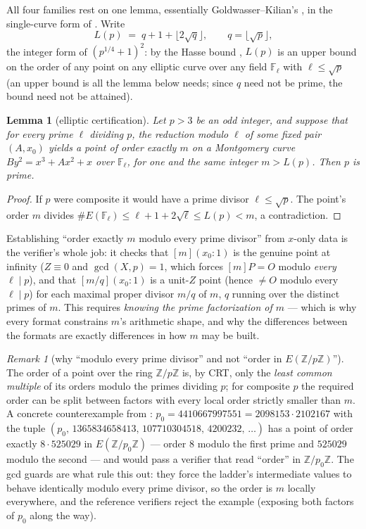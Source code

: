\documentclass[11pt]{amsart}
\newcommand{\F}{\mathbb{F}}
\newcommand{\Z}{\mathbb{Z}}
\theoremstyle{plain}
\newtheorem{lemma}[theorem]{Lemma}
\theoremstyle{definition}
\theoremstyle{remark}
\newtheorem{remark}[theorem]{Remark}
\begin{document}
All four families rest on one lemma, essentially Goldwasser--Kilian's \cite{GK86}, in the single-curve
form of \cite{Pom87}.  Write
\[
  L(p) \;=\; q + 1 + \lfloor 2\sqrt q\rfloor, \qquad q = \lfloor\sqrt p\rfloor,
\]
the integer form of $(p^{1/4}+1)^2$: by the Hasse bound \cite[V.1]{Sil09}, $L(p)$ is an upper bound on
the order of any point on any elliptic curve over any field $\F_\ell$ with $\ell \le \sqrt p$ (an upper
bound is all the lemma below needs; since $q$ need not be prime, the bound need not be attained).

\begin{lemma}[elliptic certification]\label{lem:cert}
Let $p > 3$ be an odd integer, and suppose that for every prime $\ell$ dividing $p$, the reduction
modulo $\ell$ of some fixed pair $(A, x_0)$ yields a point of order exactly $m$ on a Montgomery curve
$By^2 = x^3+Ax^2+x$ over $\F_\ell$, for one and the same integer $m > L(p)$.  Then $p$ is prime.
\end{lemma}

\begin{proof}
If $p$ were composite it would have a prime divisor $\ell \le \sqrt p$.  The point's order $m$ divides
$\#E(\F_\ell) \le \ell + 1 + 2\sqrt\ell \le L(p) < m$, a contradiction.
\end{proof}

Establishing ``order exactly $m$ modulo every prime divisor'' from $x$-only data is the verifier's whole
job: it checks that $[m](x_0{:}1)$ is the genuine point at infinity ($Z \equiv 0$ and
$\gcd(X, p) = 1$, which forces $[m]P = O$ modulo \emph{every} $\ell \mid p$), and that
$[m/q](x_0{:}1)$ is a unit-$Z$ point (hence ${}\ne O$ modulo every $\ell \mid p$) for each maximal
proper divisor $m/q$ of $m$, $q$ running over the distinct primes of $m$.  This requires \emph{knowing
the prime factorization of $m$} --- which is why every format constrains $m$'s arithmetic shape, and why
the differences between the formats are exactly differences in how $m$ may be built.

\begin{remark}[why ``modulo every prime divisor'' and not ``order in $E(\Z/p\Z)$'']\label{rem:crt}
The order of a point over the ring $\Z/p\Z$ is, by CRT, only the \emph{least common multiple} of its
orders modulo the primes dividing $p$; for composite $p$ the required order can be split between factors
with every local order strictly smaller than $m$.  A concrete counterexample from \cite{Short}:
$p_0 = 4410667997551 = 2098153\cdot 2102167$ with the tuple
$(p_0,\, 1365834658413,\, 107710304518,\, 4200232,\,\dots)$ has a point of order exactly
$8\cdot 525029$ in $E(\Z/p_0\Z)$ --- order $8$ modulo the first prime and $525029$ modulo the second ---
and would pass a verifier that read ``order'' in $\Z/p_0\Z$.  The gcd guards are what rule this out:
they force the ladder's intermediate values to behave identically modulo every prime divisor, so the
order is $m$ locally everywhere, and the reference verifiers reject the example (exposing both factors
of $p_0$ along the way).
\end{remark}
\end{document}
